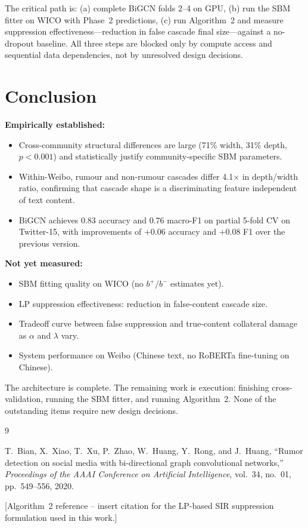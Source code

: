 \documentclass[conference]{IEEEtran}
\begin{document}
The critical path is: (a) complete BiGCN folds 2--4 on GPU,
(b) run the SBM fitter on WICO with Phase~2 predictions,
(c) run Algorithm~2 and measure suppression effectiveness---reduction in false
cascade final size---against a no-dropout baseline.
All three steps are blocked only by compute access and sequential data
dependencies, not by unresolved design decisions.

\section{Conclusion}

\textbf{Empirically established:}
\begin{itemize}
  \item Cross-community structural differences are large (71\% width, 31\%
    depth, \(p < 0.001\)) and statistically justify community-specific SBM
    parameters.
  \item Within-Weibo, rumour and non-rumour cascades differ 4.1$\times$ in
    depth/width ratio, confirming that cascade shape is a discriminating feature
    independent of text content.
  \item BiGCN achieves 0.83 accuracy and 0.76 macro-F1 on partial 5-fold CV on
    Twitter-15, with improvements of \(+0.06\) accuracy and \(+0.08\) F1 over
    the previous version.
\end{itemize}

\textbf{Not yet measured:}
\begin{itemize}
  \item SBM fitting quality on WICO (no \(b^+/b^-\) estimates yet).
  \item LP suppression effectiveness: reduction in false-content cascade size.
  \item Tradeoff curve between false suppression and true-content collateral
    damage as \(\alpha\) and \(\lambda\) vary.
  \item System performance on Weibo (Chinese text, no RoBERTa fine-tuning on
    Chinese).
\end{itemize}

The architecture is complete.
The remaining work is execution: finishing cross-validation, running the SBM
fitter, and running Algorithm~2.
None of the outstanding items require new design decisions.


\begin{thebibliography}{9}

T.\ Bian, X.\ Xiao, T.\ Xu, P.\ Zhao, W.\ Huang, Y.\ Rong, and J.\ Huang,
``Rumor detection on social media with bi-directional graph convolutional
networks,''
\textit{Proceedings of the AAAI Conference on Artificial Intelligence},
vol.~34, no.~01, pp.~549--556, 2020.

[Algorithm~2 reference -- insert citation for the LP-based SIR suppression
formulation used in this work.]

\end{thebibliography}
\end{document}
